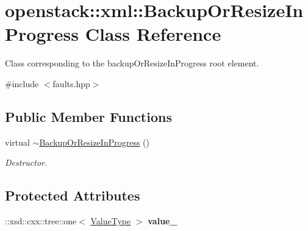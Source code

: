 \hypertarget{classopenstack_1_1xml_1_1BackupOrResizeInProgress}{
\section{openstack::xml::BackupOrResizeInProgress Class Reference}
\label{classopenstack_1_1xml_1_1BackupOrResizeInProgress}
}


Class corresponding to the backupOrResizeInProgress root element.  




{\ttfamily \#include $<$faults.hpp$>$}

\subsection*{Public Member Functions}
\begin{DoxyCompactItemize}
\item 
\hypertarget{classopenstack_1_1xml_1_1BackupOrResizeInProgress_a2c7c46b76eb4d875b8cf2c68958205bb}{
virtual \hyperlink{classopenstack_1_1xml_1_1BackupOrResizeInProgress_a2c7c46b76eb4d875b8cf2c68958205bb}{$\sim$BackupOrResizeInProgress} ()}
\label{classopenstack_1_1xml_1_1BackupOrResizeInProgress_a2c7c46b76eb4d875b8cf2c68958205bb}

\begin{DoxyCompactList}\small\item\em Destructor. \item\end{DoxyCompactList}\end{DoxyCompactItemize}
\subsection*{Protected Attributes}
\begin{DoxyCompactItemize}
\item 
\hypertarget{classopenstack_1_1xml_1_1BackupOrResizeInProgress_a63780be06d0395dda059aadf31a5629d}{
::xsd::cxx::tree::one$<$ \hyperlink{classopenstack_1_1xml_1_1BackupOrResizeInProgressAPIFault}{ValueType} $>$ {\bfseries value\_\-}}
\label{classopenstack_1_1xml_1_1BackupOrResizeInProgress_a63780be06d0395dda059aadf31a5629d}

\end{DoxyCompactItemize}
